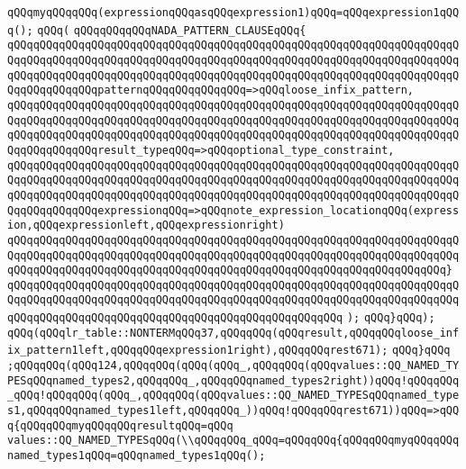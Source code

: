 \verb|qQQqmyqQQqqQQq(expressionqQQqasqQQqexpression1)qQQq=qQQqexpression1qQQq();|\newline
\verb|qQQq(|\newline
\verb|qQQqqQQqqQQqNADA_PATTERN_CLAUSEqQQq{|\newline
\verb|qQQqqQQqqQQqqQQqqQQqqQQqqQQqqQQqqQQqqQQqqQQqqQQqqQQqqQQqqQQqqQQqqQQqqQQqqQQqqQQqqQQqqQQqqQQqqQQqqQQqqQQqqQQqqQQqqQQqqQQqqQQqqQQqqQQqqQQqqQQqqQQqqQQqqQQqqQQqqQQqqQQqqQQqqQQqqQQqqQQqqQQqqQQqqQQqqQQqqQQqqQQqqQQqqQQqqQQqqQQqqQQqpatternqQQqqQQqqQQqqQQq=>qQQqloose_infix_pattern,|\newline
\verb|qQQqqQQqqQQqqQQqqQQqqQQqqQQqqQQqqQQqqQQqqQQqqQQqqQQqqQQqqQQqqQQqqQQqqQQqqQQqqQQqqQQqqQQqqQQqqQQqqQQqqQQqqQQqqQQqqQQqqQQqqQQqqQQqqQQqqQQqqQQqqQQqqQQqqQQqqQQqqQQqqQQqqQQqqQQqqQQqqQQqqQQqqQQqqQQqqQQqqQQqqQQqqQQqqQQqqQQqqQQqqQQqresult_typeqQQq=>qQQqoptional_type_constraint,|\newline
\verb|qQQqqQQqqQQqqQQqqQQqqQQqqQQqqQQqqQQqqQQqqQQqqQQqqQQqqQQqqQQqqQQqqQQqqQQqqQQqqQQqqQQqqQQqqQQqqQQqqQQqqQQqqQQqqQQqqQQqqQQqqQQqqQQqqQQqqQQqqQQqqQQqqQQqqQQqqQQqqQQqqQQqqQQqqQQqqQQqqQQqqQQqqQQqqQQqqQQqqQQqqQQqqQQqqQQqqQQqqQQqqQQqexpressionqQQq=>qQQqnote_expression_locationqQQq(expression,qQQqexpressionleft,qQQqexpressionright)|\newline
\verb|qQQqqQQqqQQqqQQqqQQqqQQqqQQqqQQqqQQqqQQqqQQqqQQqqQQqqQQqqQQqqQQqqQQqqQQqqQQqqQQqqQQqqQQqqQQqqQQqqQQqqQQqqQQqqQQqqQQqqQQqqQQqqQQqqQQqqQQqqQQqqQQqqQQqqQQqqQQqqQQqqQQqqQQqqQQqqQQqqQQqqQQqqQQqqQQqqQQqqQQqqQQqqQQq}|\newline
\verb|qQQqqQQqqQQqqQQqqQQqqQQqqQQqqQQqqQQqqQQqqQQqqQQqqQQqqQQqqQQqqQQqqQQqqQQqqQQqqQQqqQQqqQQqqQQqqQQqqQQqqQQqqQQqqQQqqQQqqQQqqQQqqQQqqQQqqQQqqQQqqQQqqQQqqQQqqQQqqQQqqQQqqQQqqQQqqQQqqQQqqQQqqQQqqQQq|\newline
\verb|);|\newline
\verb|qQQq}qQQq);|\newline
\verb|qQQq(qQQqlr_table::NONTERMqQQq37,qQQqqQQq(qQQqresult,qQQqqQQqloose_infix_pattern1left,qQQqqQQqexpression1right),qQQqqQQqrest671);|\newline
\verb|qQQq}qQQq|\newline
\verb|;qQQqqQQq(qQQq124,qQQqqQQq(qQQq(qQQq_,qQQqqQQq(qQQqvalues::QQ_NAMED_TYPESqQQqnamed_types2,qQQqqQQq_,qQQqqQQqnamed_types2right))qQQq!qQQqqQQq_qQQq!qQQqqQQq(qQQq_,qQQqqQQq(qQQqvalues::QQ_NAMED_TYPESqQQqnamed_types1,qQQqqQQqnamed_types1left,qQQqqQQq_))qQQq!qQQqqQQqrest671))qQQq=>qQQq{qQQqqQQqmyqQQqqQQqresultqQQq=qQQq|\newline
\verb|values::QQ_NAMED_TYPESqQQq(\\qQQqqQQq_qQQq=qQQqqQQq{qQQqqQQqmyqQQqqQQqnamed_types1qQQq=qQQqnamed_types1qQQq();|\newline
